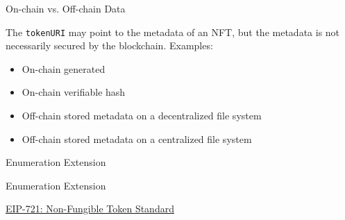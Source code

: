 \documentclass[]{beamer}
\begin{document}
\begin{frame}{On-chain vs. Off-chain Data}

The \texttt{tokenURI} may point to the metadata of an NFT, but the metadata is not necessarily secured by the blockchain. Examples:\\

	\begin{itemize}
		\item<2-> On-chain generated %
		\item<3-> On-chain verifiable hash %
		\item<4-> Off-chain stored metadata on a decentralized file system %
		\item<5-> Off-chain stored metadata on a centralized file system %
	\end{itemize}
\end{frame}

\begin{frame}{Enumeration Extension}
\begin{samplecode}{Enumeration Extension}
		
\end{samplecode}

\vspace{1 em}
\link \href{https://eips.ethereum.org/EIPS/eip-721}{EIP-721: Non-Fungible Token Standard}
\end{frame}

%	
%	
\end{document}

